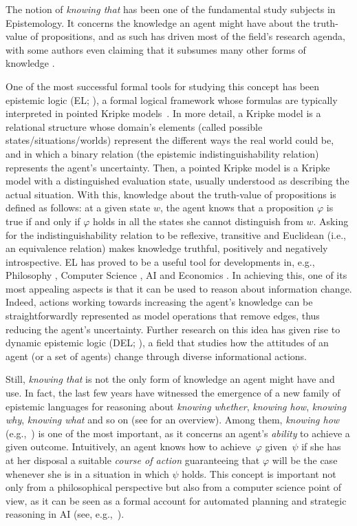 The notion of \emph{knowing that} has been one of the fundamental study subjects in Epistemology. It concerns the knowledge an agent might have about the truth-value of propositions, and as such has driven most of the field's research agenda, with some authors even claiming that it subsumes many other forms of knowledge \cite{BoenLycan75}. 

One of the most successful formal tools for studying this concept has been epistemic logic (EL; \cite{Hintikka:kab}), a formal logical framework whose formulas are typically interpreted in pointed Kripke models~\cite{mlbook,HML}. In more detail, a Kripke model is a relational structure whose domain's elements (called possible states/situations/worlds) represent the different ways the real world could be, and in which a binary relation (the epistemic indistinguishability relation) represents the agent's uncertainty. Then, a pointed Kripke model is a Kripke model with a distinguished evaluation state, usually understood as describing the actual situation. With this, knowledge about the truth-value of propositions is defined as follows: at a given state $w$, the agent knows that a proposition $\varphi$ is true if and only if $\varphi$ holds in all the states she cannot distinguish from $w$. Asking for the indistinguishability relation to be reflexive, transitive and Euclidean (i.e., an equivalence relation) makes knowledge truthful, positively and negatively introspective. EL has proved to be a useful tool for developments in, e.g., Philosophy \cite{rfe,Holliday2018}, Computer Science \cite{RAK}, AI \cite{elfaics} and Economics \cite{egepgt}. In achieving this, one of its most appealing aspects is that it can be used to reason about information change. Indeed, actions working towards increasing the agent's knowledge can be straightforwardly represented as model operations that remove edges, thus reducing the agent's uncertainty. Further research on this idea has given rise to dynamic epistemic logic (DEL; \cite{DELbook,vanBenthem2011ldii}), a field that studies how the attitudes of an agent (or a set of agents) change through diverse informational actions. 

\smallskip

Still, \emph{knowing that} is not the only form of knowledge an agent might have and use. In fact, the last few years have witnessed the emergence of a new family of epistemic languages for reasoning about \emph{knowing whether}, \emph{knowing how}, \emph{knowing why}, \emph{knowing what} and so on (see \cite{Wang16} for an overview). Among them, \emph{knowing how} (e.g.,~\cite{Pavese22}) is one of the most important, as it concerns an agent's \emph{ability} to achieve a given outcome. Intuitively, an agent knows how to achieve~$\varphi$ given~$\psi$ if she has at her disposal a suitable \emph{course of action} guaranteeing that $\varphi$ will be the case whenever she is in a situation in which $\psi$ holds. This concept is important not only from a philosophical perspective but also from a computer science point of view, as it can be seen as a formal account for automated planning and strategic reasoning in AI (see, e.g.,~\cite{KandA15}).

